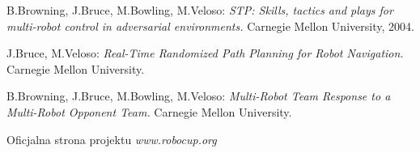 \documentclass[11pt,onecolumn,a4paper,final]{article}
\begin{document}
\begin{thebibliography}{9}
	B.Browning, J.Bruce, M.Bowling, M.Veloso:
	\emph{STP: Skills, tactics and plays for multi-robot control
             in adversarial environments.}
	  Carnegie Mellon University, 2004.

	J.Bruce, M.Veloso: 
	\emph{Real-Time Randomized Path Planning for Robot Navigation.}
	  Carnegie Mellon University.

	B.Browning, J.Bruce, M.Bowling, M.Veloso:
	\emph{Multi-Robot Team Response to a Multi-Robot
             Opponent Team.}
	  Carnegie Mellon University.
	  
	Oficjalna strona projektu
	\emph{www.robocup.org}

\end{thebibliography}
\end{document}
